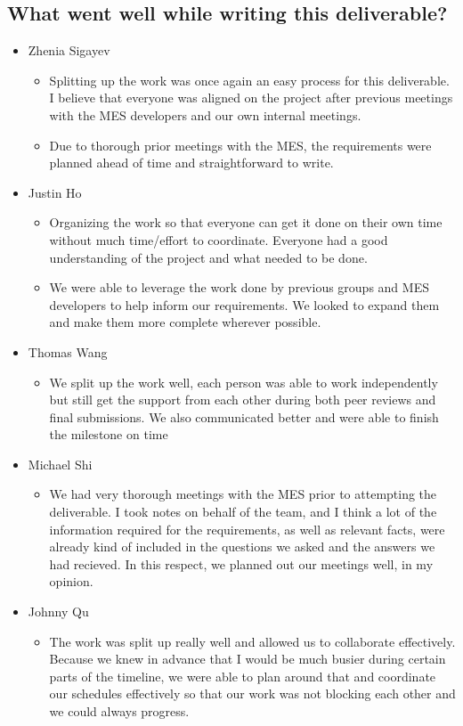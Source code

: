 \documentclass[12pt]{article}
\begin{document}
  \subsection{What went well while writing this deliverable?}
   \begin{itemize}
    \item Zhenia Sigayev
      \begin{itemize}[label=$\circ$]
        \item Splitting up the work was once again an easy process for this deliverable. I believe that everyone was aligned on the project after previous meetings with the MES developers and our own internal meetings.
        \item Due to thorough prior meetings with the MES, the requirements were planned ahead of time and straightforward to write.
      \end{itemize}
    \item Justin Ho
      \begin{itemize}[label=$\circ$]
        \item Organizing the work so that everyone can get it done on their own time without much time/effort to coordinate. Everyone had a good understanding of the project and what needed to be done.
        \item We were able to leverage the work done by previous groups and MES developers to help inform our requirements. We looked to expand them and make them more complete wherever possible.
      \end{itemize}
    \item Thomas Wang
      \begin{itemize}[label=$\circ$]
        \item We split up the work well, each person was able to work independently but still get the support from each other during both peer reviews and final submissions. We also communicated better and were able to finish the milestone on time
      \end{itemize}
    \item Michael Shi
      \begin{itemize}[label=$\circ$]
        \item We had very thorough meetings with the MES prior to attempting the deliverable. I took notes on behalf of the team, and I think a lot of the information required for the requirements, as well as relevant facts, were already kind of included in the questions we asked and the answers we had recieved. In this respect, we planned out our meetings well, in my opinion.
      \end{itemize}
    \item Johnny Qu
      \begin{itemize}[label=$\circ$]
        \item The work was split up really well and allowed us to collaborate effectively. Because we knew in advance that I would be much busier during certain parts of the timeline, we were able to plan around that and coordinate our schedules effectively so that our work was not blocking each other and we could always progress. 
      \end{itemize}
  \end{itemize}
\end{document}
